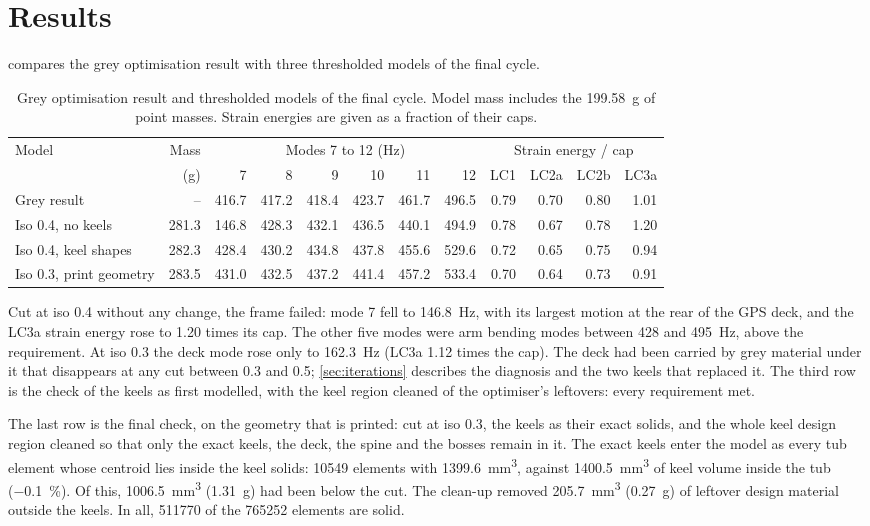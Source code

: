 \section{Results}\label{sec:verification-results}

 compares the grey optimisation result with three thresholded models of the final cycle.

\begin{table}[htbp]
\centering\small
\caption{Grey optimisation result and thresholded models of the final cycle. Model mass includes the \SI{199.58}{g} of point masses. Strain energies are given as a fraction of their caps.}\label{tab:verification-results}
\setlength{\tabcolsep}{3pt}
\begin{tabular}{@{}lrrrrrrrrrrr@{}}
\toprule
Model & Mass & \multicolumn{6}{c}{Modes 7 to 12 (\si{Hz})} & \multicolumn{4}{c}{Strain energy / cap}\\
\cmidrule(lr){3-8}\cmidrule(l){9-12}
 & (\si{g}) & 7 & 8 & 9 & 10 & 11 & 12 & LC1 & LC2a & LC2b & LC3a\\
\midrule
Grey result & -- & 416.7 & 417.2 & 418.4 & 423.7 & 461.7 & 496.5 & 0.79 & 0.70 & 0.80 & 1.01\\
Iso 0.4, no keels & 281.3 & 146.8 & 428.3 & 432.1 & 436.5 & 440.1 & 494.9 & 0.78 & 0.67 & 0.78 & 1.20\\
Iso 0.4, keel shapes & 282.3 & 428.4 & 430.2 & 434.8 & 437.8 & 455.6 & 529.6 & 0.72 & 0.65 & 0.75 & 0.94\\
Iso 0.3, print geometry & 283.5 & 431.0 & 432.5 & 437.2 & 441.4 & 457.2 & 533.4 & 0.70 & 0.64 & 0.73 & 0.91\\
\bottomrule
\end{tabular}
\end{table}

Cut at iso 0.4 without any change, the frame failed: mode 7 fell to \SI{146.8}{Hz}, with its largest motion at the rear of the GPS deck, and the LC3a strain energy rose to 1.20 times its cap. The other five modes were arm bending modes between 428 and \SI{495}{Hz}, above the requirement. At iso 0.3 the deck mode rose only to \SI{162.3}{Hz} (LC3a 1.12 times the cap). The deck had been carried by grey material under it that disappears at any cut between 0.3 and 0.5; \cref{sec:iterations} describes the diagnosis and the two keels that replaced it. The third row is the check of the keels as first modelled, with the keel region cleaned of the optimiser's leftovers: every requirement met.

The last row is the final check, on the geometry that is printed: cut at iso 0.3, the keels as their exact solids, and the whole keel design region cleaned so that only the exact keels, the deck, the spine and the bosses remain in it. The exact keels enter the model as every tub element whose centroid lies inside the keel solids: \num{10549} elements with \SI{1399.6}{mm^3}, against \SI{1400.5}{mm^3} of keel volume inside the tub (\SI{-0.1}{\percent}). Of this, \SI{1006.5}{mm^3} (\SI{1.31}{g}) had been below the cut. The clean-up removed \SI{205.7}{mm^3} (\SI{0.27}{g}) of leftover design material outside the keels. In all, \num{511770} of the \num{765252} elements are solid.

